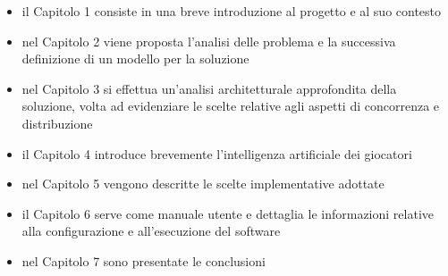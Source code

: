 \begin{itemize}
	\item il Capitolo 1 consiste in una breve introduzione al progetto e al suo contesto
	\item nel Capitolo 2 viene proposta l'analisi delle problema e la successiva definizione di un modello per la soluzione
	\item nel Capitolo 3 si effettua un'analisi architetturale approfondita della soluzione, volta ad evidenziare le scelte relative agli aspetti di concorrenza e distribuzione
	\item il Capitolo 4 introduce brevemente l'intelligenza artificiale dei giocatori
	\item nel Capitolo 5 vengono descritte le scelte implementative adottate
	\item il Capitolo 6 serve come manuale utente e dettaglia le informazioni relative alla configurazione e all'esecuzione del software
	\item nel Capitolo 7 sono presentate le conclusioni
\end{itemize}
